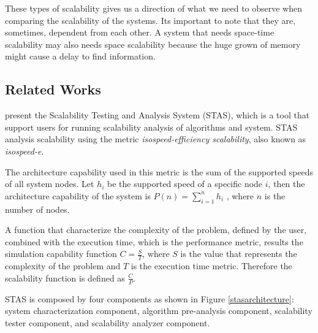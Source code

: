 These types of scalability gives us a direction of what we need to observe when comparing the scalability of the systems. Its important to note that they are, sometimes, dependent from each other. A system that needs space-time scalability may also needs space scalability because the huge grown of memory might cause a delay to find information.

\subsection{Related Works}

\cite{STAS} present the Scalability Testing and Analysis System (STAS), which is a tool that support users for running scalability analysis of algorithms and system. STAS analysis scalability using the metric \emph{isospeed-efficiency scalability}, also known as \emph{isospeed-e}. 

The architecture capability used in this metric is the sum of the supported speeds of all system nodes. Let $h_{i}$ be the supported speed of a specific node $i$, then the architecture capability of the system is $P(n) = \sum_{i=1}^{n} h_i$ , where $n$ is the number of nodes. 

A function that characterize the complexity of the problem, defined by the user, combined with the execution time, which is the performance metric, results the simulation capability function $C = \frac{S}{T}$, where $S$ is the value that represents the complexity of the problem and $T$ is the execution time metric. Therefore the scalability function is defined as $\frac{C}{P}$.

STAS is composed by four components as shown in Figure \ref{stasarchitecture}: system characterization component, algorithm pre-analysis component, scalability tester component, and scalability analyzer component.

